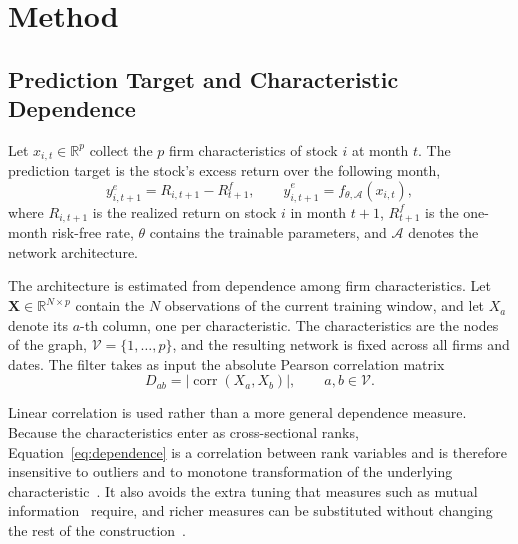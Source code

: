 \documentclass[sigconf,nonacm]{acmart}
\begin{document}
\section{Method}
\label{method}

\subsection{Prediction Target and Characteristic Dependence}

Let \(x_{i,t}\in\mathbb{R}^{p}\) collect the \(p\) firm characteristics of
stock \(i\) at month \(t\). The prediction target is the stock's excess return
over the following month,
\begin{equation}
 y^{e}_{i,t+1}
 =
 R_{i,t+1}-R^{f}_{t+1},
 \qquad
 \widehat y^{e}_{i,t+1}
 =
 f_{\theta,\mathcal A}(x_{i,t}),
 \label{eq:prediction}
\end{equation}
where \(R_{i,t+1}\) is the realized return on stock \(i\) in month \(t+1\),
\(R^{f}_{t+1}\) is the one-month risk-free rate, \(\theta\) contains the
trainable parameters, and \(\mathcal A\) denotes the network architecture.

The architecture is estimated from dependence among firm characteristics. Let
\(\mathbf X\in\mathbb{R}^{N\times p}\) contain the \(N\) observations of the current training window, and let \(X_a\) denote its \(a\)-th column,
one per characteristic. The characteristics are the nodes of the graph,
\(\mathcal V=\{1,\ldots,p\}\), and the resulting network is fixed across all firms and dates. The filter takes as input the absolute Pearson correlation matrix 
\begin{equation}
 D_{ab}
 =
 \left|
 \operatorname{corr}(X_a,X_b)
 \right|,
 \qquad a,b\in\mathcal V .
 \label{eq:dependence}
\end{equation}

Linear correlation is used rather than a more general dependence measure.
Because the characteristics enter as cross-sectional ranks,
Equation~\eqref{eq:dependence} is a correlation between rank variables and is
therefore insensitive to outliers and to monotone transformation of the
underlying characteristic~\cite{kendall1970}. It also avoids the extra tuning that measures such
as mutual information~\cite{cover2006elements} require, and richer measures can be substituted without
changing the rest of the construction~\cite{lin2026}.
\end{document}
